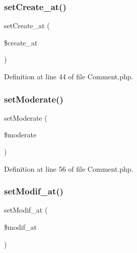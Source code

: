 \mbox{\label{class_src_1_1_entity_1_1_comment_ad12db04fd7abd82e8172ebee19c45ff1}} 
\subsubsection{set\+Create\+\_\+at()}
{\footnotesize\ttfamily set\+Create\+\_\+at (\begin{DoxyParamCaption}\item[{Date\+Time}]{\$create\+\_\+at }\end{DoxyParamCaption})}



Definition at line 44 of file Comment.\+php.

\mbox{\label{class_src_1_1_entity_1_1_comment_a0067c44a7d1de40089ffed311672b328}} 
\subsubsection{set\+Moderate()}
{\footnotesize\ttfamily set\+Moderate (\begin{DoxyParamCaption}\item[{}]{\$moderate }\end{DoxyParamCaption})}



Definition at line 56 of file Comment.\+php.

\mbox{\label{class_src_1_1_entity_1_1_comment_a9f9f5983de6ae197176a80f55f113a6c}} 
\subsubsection{set\+Modif\+\_\+at()}
{\footnotesize\ttfamily set\+Modif\+\_\+at (\begin{DoxyParamCaption}\item[{Date\+Time}]{\$modif\+\_\+at }\end{DoxyParamCaption})}



